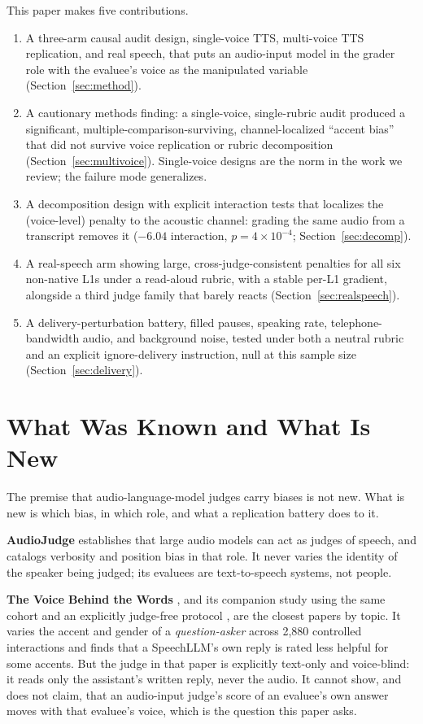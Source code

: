 This paper makes five contributions.
\begin{enumerate}
\item A three-arm causal audit design, single-voice TTS, multi-voice TTS
replication, and real speech, that puts an audio-input model in the grader
role with the evaluee's voice as the manipulated variable
(Section~\ref{sec:method}).
\item A cautionary methods finding: a single-voice, single-rubric audit
produced a significant, multiple-comparison-surviving,
channel-localized ``accent bias'' that did not survive voice replication or
rubric decomposition (Section~\ref{sec:multivoice}). Single-voice designs
are the norm in the work we review; the failure mode generalizes.
\item A decomposition design with explicit interaction tests that localizes
the (voice-level) penalty to the acoustic channel: grading the same audio
from a transcript removes it ($-6.04$ interaction, $p=4\times10^{-4}$;
Section~\ref{sec:decomp}).
\item A real-speech arm showing large, cross-judge-consistent penalties for
all six non-native L1s under a read-aloud rubric, with a stable per-L1
gradient, alongside a third judge family that barely reacts
(Section~\ref{sec:realspeech}).
\item A delivery-perturbation battery, filled pauses, speaking rate,
telephone-bandwidth audio, and background noise, tested under both a neutral
rubric and an explicit ignore-delivery instruction, null at this sample size
(Section~\ref{sec:delivery}).
\end{enumerate}

\section{What Was Known and What Is New}

The premise that audio-language-model judges carry biases is not new. What
is new is which bias, in which role, and what a replication battery does to
it.

\textbf{AudioJudge} \citep{manakul2025audiojudgeun} establishes that
large audio models can act as judges of speech, and catalogs verbosity and
position bias in that role. It never varies the identity of the speaker
being judged; its evaluees are text-to-speech systems, not people.

\textbf{The Voice Behind the Words} \citep{satish2026thevoicebehi}, and its
companion study using the same cohort and an explicitly judge-free protocol
\citep{satish2026fromseeingit}, are the closest papers by topic. It varies the accent and gender of a
\emph{question-asker} across 2,880 controlled interactions and finds that a
SpeechLLM's own reply is rated less helpful for some accents. But the judge
in that paper is explicitly text-only and voice-blind: it reads only the
assistant's written reply, never the audio. It cannot show, and does not
claim, that an audio-input judge's score of an evaluee's own answer moves
with that evaluee's voice, which is the question this paper asks.

